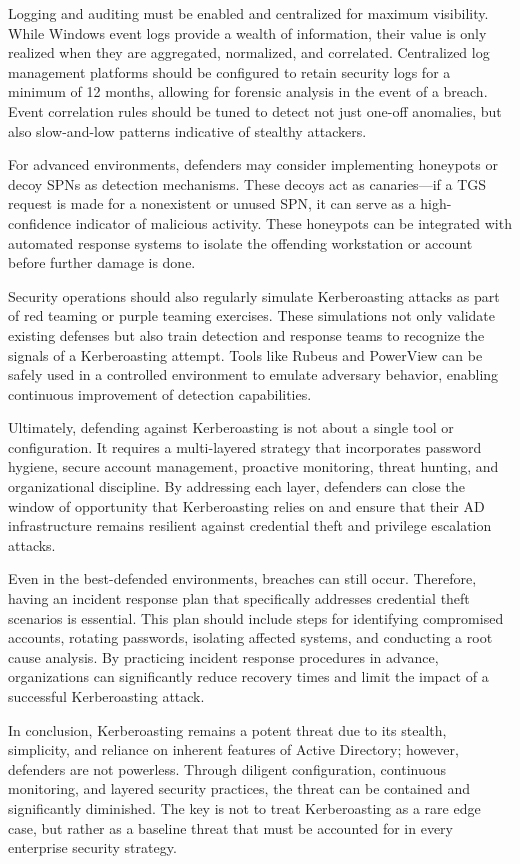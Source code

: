Logging and auditing must be enabled and centralized for maximum visibility. While Windows event logs provide a wealth of information, their value is only realized when they are aggregated, normalized, and correlated. Centralized log management platforms should be configured to retain security logs for a minimum of 12 months, allowing for forensic analysis in the event of a breach. Event correlation rules should be tuned to detect not just one-off anomalies, but also slow-and-low patterns indicative of stealthy attackers.

For advanced environments, defenders may consider implementing honeypots or decoy SPNs as detection mechanisms. These decoys act as canaries—if a TGS request is made for a nonexistent or unused SPN, it can serve as a high-confidence indicator of malicious activity. These honeypots can be integrated with automated response systems to isolate the offending workstation or account before further damage is done.

Security operations should also regularly simulate Kerberoasting attacks as part of red teaming or purple teaming exercises. These simulations not only validate existing defenses but also train detection and response teams to recognize the signals of a Kerberoasting attempt. Tools like Rubeus and PowerView can be safely used in a controlled environment to emulate adversary behavior, enabling continuous improvement of detection capabilities.

Ultimately, defending against Kerberoasting is not about a single tool or configuration. It requires a multi-layered strategy that incorporates password hygiene, secure account management, proactive monitoring, threat hunting, and organizational discipline. By addressing each layer, defenders can close the window of opportunity that Kerberoasting relies on and ensure that their AD infrastructure remains resilient against credential theft and privilege escalation attacks.

Even in the best-defended environments, breaches can still occur. Therefore, having an incident response plan that specifically addresses credential theft scenarios is essential. This plan should include steps for identifying compromised accounts, rotating passwords, isolating affected systems, and conducting a root cause analysis. By practicing incident response procedures in advance, organizations can significantly reduce recovery times and limit the impact of a successful Kerberoasting attack.

In conclusion, Kerberoasting remains a potent threat due to its stealth, simplicity, and reliance on inherent features of Active Directory; however, defenders are not powerless. Through diligent configuration, continuous monitoring, and layered security practices, the threat can be contained and significantly diminished. The key is not to treat Kerberoasting as a rare edge case, but rather as a baseline threat that must be accounted for in every enterprise security strategy.

